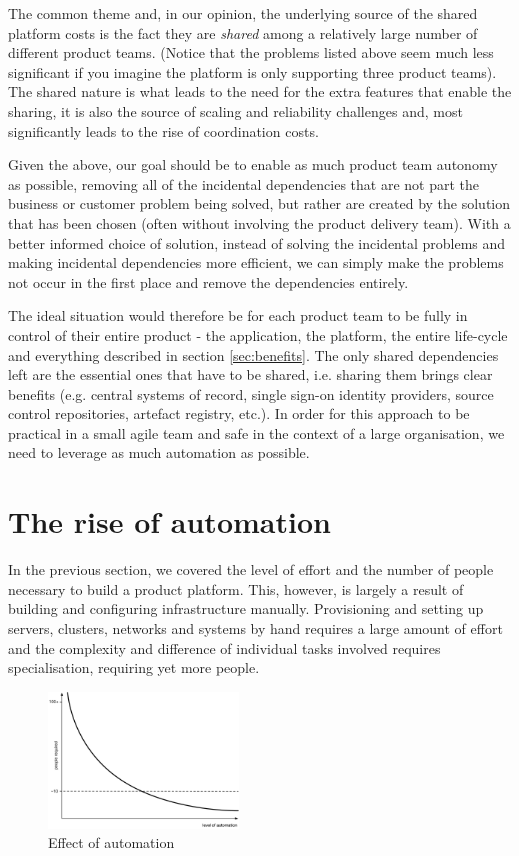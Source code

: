 \documentclass[reprint,amsmath,amssymb,aps]{revtex4-1}
\begin{document}
The common theme and, in our opinion, the underlying source of the shared platform costs is the fact they are \textit{shared} among a relatively large number of different product teams. (Notice that the problems listed above seem much less significant if you imagine the platform is only supporting three product teams). The shared nature is what leads to the need for the extra features that enable the sharing, it is also the source of scaling and reliability challenges and, most significantly leads to the rise of coordination costs.

Given the above, our goal should be to enable as much product team autonomy as possible, removing all of the incidental dependencies that are not part the business or customer problem being solved, but rather are created by the solution that has been chosen (often without involving the product delivery team). With a better informed choice of solution, instead of solving the incidental problems and making incidental dependencies more efficient, we can simply make the problems not occur in the first place and remove the dependencies entirely.

The ideal situation would therefore be for each product team to be fully in control of their entire product - the application, the platform, the entire life-cycle and everything described in section \ref{sec:benefits}. The only shared dependencies left are the essential ones that have to be shared, i.e. sharing them brings clear benefits (e.g. central systems of record, single sign-on identity providers, source control repositories, artefact registry, etc.). In order for this approach to be practical in a small agile team and safe in the context of a large organisation, we need to leverage as much automation as possible.


\section{The rise of automation}
\label{sec:automation}

In the previous section, we covered the level of effort and the number of people necessary to build a product platform. This, however, is largely a result of building and configuring infrastructure manually. Provisioning and setting up servers, clusters, networks and systems by hand requires a large amount of effort and the complexity and difference of individual tasks involved requires specialisation, requiring yet more people.
 
\begin{figure}[h]
        \includegraphics[width=0.45\textwidth]{figs/automation}
        \caption{Effect of automation}
        \label{fig:automationn}
\end{figure}
\end{document}
